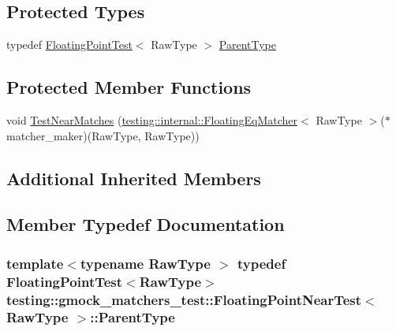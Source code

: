 \subsection*{Protected Types}
\begin{DoxyCompactItemize}
\item 
typedef \hyperlink{classtesting_1_1gmock__matchers__test_1_1_floating_point_test}{Floating\+Point\+Test}$<$ Raw\+Type $>$ \hyperlink{classtesting_1_1gmock__matchers__test_1_1_floating_point_near_test_ac767d2bf3e518d1e7cf9dfafc76cc53a}{Parent\+Type}
\end{DoxyCompactItemize}
\subsection*{Protected Member Functions}
\begin{DoxyCompactItemize}
\item 
void \hyperlink{classtesting_1_1gmock__matchers__test_1_1_floating_point_near_test_a712b564197ab76f58d345c5e3e73955d}{Test\+Near\+Matches} (\hyperlink{classtesting_1_1internal_1_1_floating_eq_matcher}{testing\+::internal\+::\+Floating\+Eq\+Matcher}$<$ Raw\+Type $>$($\ast$matcher\+\_\+maker)(Raw\+Type, Raw\+Type))
\end{DoxyCompactItemize}
\subsection*{Additional Inherited Members}


\subsection{Member Typedef Documentation}
\subsubsection[{\texorpdfstring{Parent\+Type}{ParentType}}]{\setlength{\rightskip}{0pt plus 5cm}template$<$typename Raw\+Type $>$ typedef {\bf Floating\+Point\+Test}$<$Raw\+Type$>$ {\bf testing\+::gmock\+\_\+matchers\+\_\+test\+::\+Floating\+Point\+Near\+Test}$<$ Raw\+Type $>$\+::{\bf Parent\+Type}\hspace{0.3cm}{\ttfamily [protected]}}\hypertarget{classtesting_1_1gmock__matchers__test_1_1_floating_point_near_test_ac767d2bf3e518d1e7cf9dfafc76cc53a}{}\label{classtesting_1_1gmock__matchers__test_1_1_floating_point_near_test_ac767d2bf3e518d1e7cf9dfafc76cc53a}


